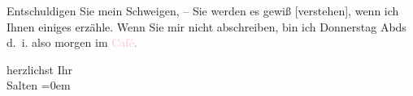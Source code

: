 \pstart
           Entschuldigen Sie mein Schweigen, – Sie werden es
               gewiß {[}verstehen{]}, wenn ich Ihnen einiges erzähle. Wenn Sie mir
               nicht abschreiben, bin ich Donnerstag{ }Abds d. i. also morgen im \textcolor{pink}{Café}{}\ledrightnote{{$\rightarrow$}\textcolor{pink}{Café Kaiserhof (Inh. Johann Wortner)}}\textcolor{gray}{.}\pend
           
\pstart
           herzlichst Ihr {\\[\baselineskip]}\spacefill\mbox{Salten}\pend
           \leftskip=0em{}\endnumbering{}  
      
